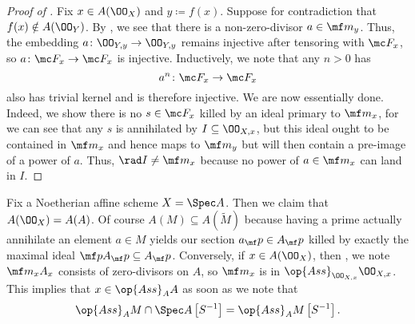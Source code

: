 \documentclass[../notes.tex]{subfiles}
\begin{document}
\begin{proof}[Proof of ]
	Fix $x\in A(\OO_X)$ and $y\coloneqq f(x)$. Suppose for contradiction that $f(x)\notin A(\OO_Y)$. By , we see that there is a non-zero-divisor $a\in\mf m_y$. Thus, the embedding $a\colon\OO_{Y,y}\to\OO_{Y,y}$ remains injective after tensoring with $\mc F_x$, so $a\colon\mc F_x\to\mc F_x$ is injective. Inductively, we note that any $n>0$ has
	\[a^n\colon\mc F_x\to\mc F_x\]
	also has trivial kernel and is therefore injective. We are now essentially done. Indeed, we show there is no $s\in\mc F_x$ killed by an ideal primary to $\mf m_x$, for we can see that any $s$ is annihilated by $I\subseteq\OO_{X,x}$, but this ideal ought to be contained in $\mf m_x$ and hence maps to $\mf m_y$ but will then contain a pre-image of a power of $a$. Thus, $\rad I\ne\mf m_x$ because no power of $a\in\mf m_x$ can land in $I$.
\end{proof}
\begin{remark}
	Fix a Noetherian affine scheme $X=\Spec A$. Then we claim that $A(\OO_X)=A(A)$. Of course $A(M)\subseteq A(\widetilde M)$ because having a prime actually annihilate an element $a\in M$ yields our section $a_\mf p\in A_\mf p$ killed by exactly the maximal ideal $\mf pA_\mf p\subseteq A_\mf p$. Conversely, if $x\in A(\OO_X)$, then , we note $\mf m_xA_x$ consists of zero-divisors on $A$, so $\mf m_x$ is in $\op{Ass}_{\OO_{X,x}}\OO_{X,x}$. This implies that $x\in\op{Ass}_AA$ as soon as we note that
	\[\op{Ass}_AM\cap\Spec A\left[S^{-1}\right]=\op{Ass}_AM\left[S^{-1}\right].\]
\end{remark}
\end{document}
